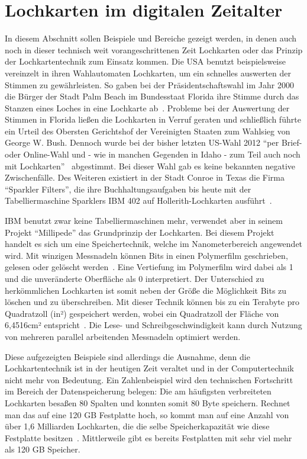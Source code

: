 \documentclass[parskip=half]{scrartcl}
\begin{document}
\section{Lochkarten im digitalen Zeitalter}

In diesem Abschnitt sollen Beispiele und Bereiche gezeigt werden, in denen auch
noch in dieser technisch weit vorangeschrittenen Zeit Lochkarten oder das
Prinzip der Lochkartentechnik zum Einsatz kommen. Die USA benutzt
beispielsweise vereinzelt in ihren Wahlautomaten Lochkarten, um ein schnelles
auswerten der Stimmen zu gewährleisten. So gaben bei der Präsidentschaftswahl
im Jahr 2000 die Bürger der Stadt Palm Beach im Bundesstaat Florida ihre Stimme
durch das Stanzen eines Loches in eine Lochkarte ab~\cite{simons}. Probleme bei der Auswertung der Stimmen in Florida ließen die Lochkarten
in Verruf geraten und schließlich führte ein Urteil des Obersten Gerichtshof
der Vereinigten Staaten zum Wahlsieg von George W. Bush. Dennoch wurde bei der
bisher letzten US-Wahl 2012 \enquote{per Brief- oder Online-Wahl und - wie in
manchen Gegenden in Idaho - zum Teil auch noch mit Lochkarten}~\cite{keinVerfasser}
abgestimmt.  Bei dieser Wahl gab es keine bekannten negative Zwischenfälle. Des
Weiteren existiert in der Stadt Conroe in Texas die Firma \enquote{Sparkler
Filters}, die ihre Buchhaltungsaufgaben bis heute mit der Tabelliermaschine
Sparklers IBM 402 auf Hollerith-Lochkarten ausführt~\cite{edwards}.

IBM benutzt zwar keine Tabelliermaschinen mehr, verwendet aber in seinem
Projekt \enquote{Millipede} das Grundprinzip der Lochkarten. Bei diesem Projekt
handelt es sich um eine Speichertechnik, welche im Nanometerbereich angewendet
wird.  Mit winzigen Messnadeln können Bits in einen Polymerfilm geschrieben,
gelesen oder gelöscht werden~\cite{binnig}. Eine Vertiefung im
Polymerfilm wird dabei als 1 und die unveränderte Oberfläche als 0
interpretiert. Der Unterschied zu herkömmlichen Lochkarten ist somit neben der
Größe die Möglichkeit Bits zu löschen und zu überschreiben. Mit dieser Technik
können bis zu ein Terabyte pro Quadratzoll (in²) gespeichert werden, wobei ein
Quadratzoll der Fläche von 6,4516cm² entspricht~\cite{binnig}. Die
Lese- und Schreibgeschwindigkeit kann durch Nutzung von mehreren parallel
arbeitenden Messnadeln optimiert werden.

Diese aufgezeigten Beispiele sind allerdings die Ausnahme, denn die
Lochkartentechnik ist in der heutigen Zeit veraltet und in der Computertechnik
nicht mehr von Bedeutung. Ein Zahlenbeispiel wird den technischen Fortschritt
im Bereich der Datenspeicherung belegen: Die am häufigsten verbreiteten
Lochkarten besaßen 80 Spalten und konnten somit 80 Byte speichern. Rechnet man
das auf eine 120 GB Festplatte hoch, so kommt man auf eine Anzahl von über 1,6
Milliarden Lochkarten, die die selbe Speicherkapazität wie diese Festplatte
besitzen~\cite{roeltgen}. Mittlerweile gibt es bereits Festplatten mit sehr
viel mehr als 120 GB Speicher.




\end{document}
